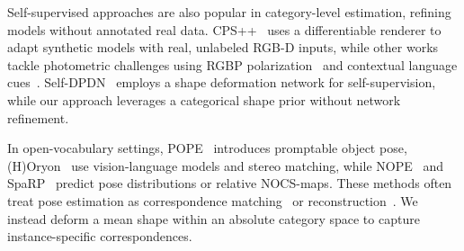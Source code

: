 Self-supervised approaches are also popular in category-level estimation, refining models without annotated real data. CPS++~\cite{manhardt2020cpspp} uses a differentiable renderer to adapt synthetic models with real, unlabeled RGB-D inputs, while other works~\cite{wang2022crocps,wang2024improving} tackle photometric challenges using RGBP polarization~\cite{gao2022polarimetric,ruhkamp2024s} and contextual language cues~\cite{wang2024improving}. Self-DPDN~\cite{lin2022category} employs a shape deformation network for self-supervision, while our approach leverages a categorical shape prior without network refinement.

In open-vocabulary settings, POPE~\cite{fan2024pope} introduces promptable object pose, (H)Oryon~\cite{corsetti2024open,corsetti2024high} use vision-language models and stereo matching, while NOPE~\cite{nguyen2024nope} and SpaRP~\cite{xu2025sparp} predict pose distributions or relative NOCS-maps. These methods often treat pose estimation as correspondence matching~\cite{corsetti2024open,fan2024pope} or reconstruction~\cite{nguyen2024nope}. We instead deform a mean shape within an absolute category space to capture instance-specific correspondences.
